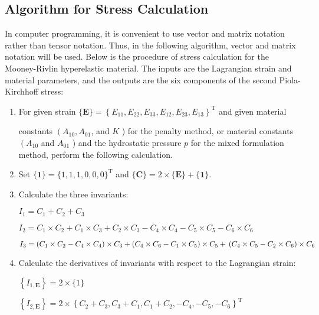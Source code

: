 \subsection{ Algorithm for Stress Calculation}

In computer programming, it is convenient to use vector and matrix notation rather than tensor notation. Thus, in the following algorithm, vector and matrix notation will be used. Below is the procedure of stress calculation for the Mooney-Rivlin hyperelastic material. The inputs are the Lagrangian strain and material parameters, and the outputs are the six components of the second Piola-Kirchhoff stress:

\begin{enumerate}
\item For given strain $ \{\mathbf{E}\}=\left\{E_{11}, E_{22}, E_{33}, E_{12}, E_{23}, E_{13}\right\}^{\mathrm{T}} $ and given material

constants $ \left(A_{10}, A_{01}\right. $, and $ K $ ) for the penalty method, or material constants $ \left(A_{10}\right. $ and $ A_{01} $ ) and the hydrostatic pressure $ p $ for the mixed formulation method, perform the following calculation.

\item  Set $ \{\mathbf{1}\}=\{1,1,1,0,0,0\}^{\mathrm{T}} $ and $ \{\mathbf{C}\}=2 \times\{\mathbf{E}\}+\{\mathbf{1}\} $.

\item  Calculate the three invariants:

$I_1=C_1 + C_2 + C_3$

$ I_{2}=C_{1} \times C_{2}+C_{1} \times C_{3}+C_{2} \times C_{3}-C_{4} \times C_{4}-C_{5} \times C_{5}-C_{6} \times C_{6} $

$ I_{3}=\left(C_{1} \times C_{2}-C_{4} \times C_{4}\right) \times C_{3}+\left(C_{4} \times C_{6}-C_{1} \times C_{5}\right) \times C_{5}+ \\ \left(C_{4} \times C_{5}-C_{2} \times C_{6}\right) \times C_{6} $



\item Calculate the derivatives of invariants with respect to the Lagrangian strain:

$\left\{I_{1, \mathbf{E}}\right\}=2 \times \{1\}$

$ \left\{I_{2, \mathbf{E}}\right\}=2 \times\left\{C_{2}+C_{3}, C_{3}+C_{1}, C_{1}+C_{2},-C_{4},-C_{5},-C_{6}\right\}^{\mathrm{T}} $




\end{enumerate}
